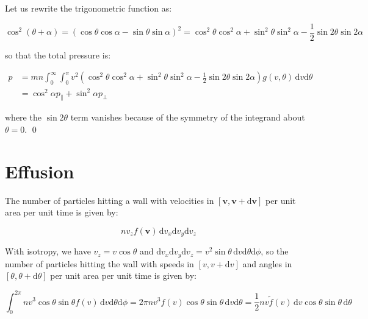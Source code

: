 \documentclass[12pt]{article}
\begin{document}
Let us rewrite the trigonometric function as:

\begin{equation}
    \cos^{2}{(\theta + \alpha)} = \left( \cos{\theta} \cos{\alpha} - \sin{\theta} \sin{\alpha} \right)^{2} = \cos^{2}{\theta} \cos^{2}{\alpha} + \sin^{2}{\theta} \sin^{2}{\alpha} - \frac{1}{2} \sin{2\theta} \sin{2\alpha}
\end{equation}

so that the total pressure is:

\begin{equation}
    \begin{split}
        p &= mn \int_{0}^{\infty} \int_{0}^{\pi} v^{2} \left( \cos^{2}{\theta} \cos^{2}{\alpha} + \sin^{2}{\theta} \sin^{2}{\alpha} - \frac{1}{2} \sin{2\theta} \sin{2\alpha} \right) g(v, \theta) \, \mathrm{d}v \mathrm{d}\theta \\
        &= \cos^{2}\alpha p_{\parallel} + \sin^{2}\alpha p_{\perp}
    \end{split}
\end{equation}

where the $\sin{2\theta}$ term vanishes because of the symmetry of the integrand about $\theta = 0$.
\qed


\pagebreak
\section*{Effusion}



The number of particles hitting a wall with velocities in $[\mathbf{v}, \mathbf{v} + \mathrm{d}\mathbf{v}]$ per unit area per unit time is given by:

\begin{equation}
    nv_{z} f(\mathbf{v}) \, \mathrm{d}v_{x} \mathrm{d}v_{y} \mathrm{d}v_{z}
\end{equation}

With isotropy, we have $v_{z} = v\cos{\theta}$ and $\mathrm{d}v_{x} \mathrm{d}v_{y} \mathrm{d}v_{z} = v^{2} \sin{\theta} \, \mathrm{d}v \mathrm{d}\theta \mathrm{d}\phi$, so the number of particles hitting the wall with speeds in $[v, v + \mathrm{d}v]$ and angles in $[\theta, \theta + \mathrm{d}\theta]$ per unit area per unit time is given by:

\begin{equation}
    \int_{0}^{2\pi} nv^{3} \cos{\theta} \sin{\theta} f(v) \, \mathrm{d}v \mathrm{d}\theta \mathrm{d}\phi = 2\pi nv^{3} f(v) \cos{\theta} \sin{\theta} \, \mathrm{d}v \mathrm{d}\theta = \frac{1}{2} nv \tilde{f}(v) \, \mathrm{d}v \cos{\theta} \sin{\theta} \, \mathrm{d}\theta
\end{equation}
\end{document}
